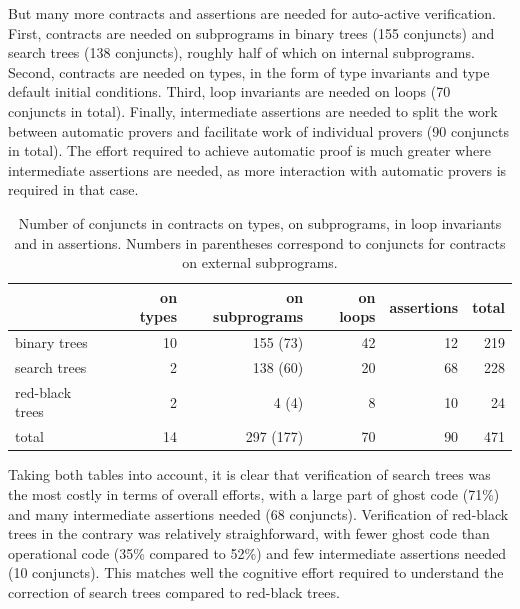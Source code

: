 \documentclass{llncs}
\begin{document}
But many more contracts and assertions are needed for auto-active
verification. First, contracts are needed on subprograms in binary trees (155
conjuncts) and search trees (138 conjuncts), roughly half of which on internal
subprograms. Second, contracts are needed on types, in the form of type
invariants and type default initial conditions. Third, loop invariants are
needed on loops (70 conjuncts in total). Finally, intermediate assertions are
needed to split the work between automatic provers and facilitate work of
individual provers (90 conjuncts in total). The effort required to achieve
automatic proof is much greater where intermediate assertions are needed, as
more interaction with automatic provers is required in that case.

\begin{table}[h]
\begin{center}
\begin{tabular}{l|rrrr|r}
                & on types & on subprograms & on loops & assertions & total \\ \hline
binary trees    & 10       & 155 (73)       & 42       & 12         & 219 \\
search trees    & 2        & 138 (60)       & 20       & 68         & 228 \\
red-black trees & 2        & 4 (4)          & 8        & 10         & 24 \\ \hline
total           & 14       & 297 (177)      & 70       & 90         & 471
\end{tabular}
\vspace*{5mm}
\caption{\label{tab-sloc2} Number of conjuncts in contracts on types, on
  subprograms, in loop invariants and in assertions. Numbers in parentheses
  correspond to conjuncts for contracts on external subprograms.}
\vspace*{-10mm}
\end{center}
\end{table}

Taking both tables into account, it is clear that verification of search trees
was the most costly in terms of overall efforts, with a large part of ghost
code (71\%) and many intermediate assertions needed (68
conjuncts). Verification of red-black trees in the contrary was relatively
straighforward, with fewer ghost code than operational code (35\% compared to
52\%) and few intermediate assertions needed (10 conjuncts). This matches well
the cognitive effort required to understand the correction of search trees
compared to red-black trees.
\end{document}

